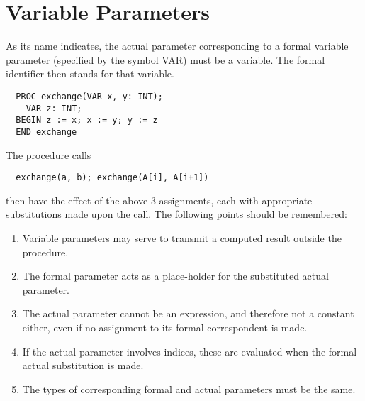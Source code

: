 \section{Variable Parameters}
As its name indicates, the actual parameter corresponding to a formal variable parameter (specified
by the symbol VAR) must be a variable. The formal identifier then stands for that variable.
\begin{verbatim}
  PROC exchange(VAR x, y: INT);
    VAR z: INT;
  BEGIN z := x; x := y; y := z
  END exchange
\end{verbatim}
The procedure calls
\begin{verbatim}
  exchange(a, b); exchange(A[i], A[i+1])
\end{verbatim}
then have the effect of the above 3 assignments, each with appropriate substitutions made
upon the call. The following points should be remembered:
\begin{enumerate}
  \item Variable parameters may serve to transmit a computed result outside the procedure.
  \item The formal parameter acts as a place-holder for the substituted actual parameter.
  \item The actual parameter cannot be an expression, and therefore not a constant either,
    even if no assignment to its formal correspondent is made.
  \item If the actual parameter involves indices, these are evaluated when the formal-actual
    substitution is made.
  \item The types of corresponding formal and actual parameters must be the same.
\end{enumerate}

